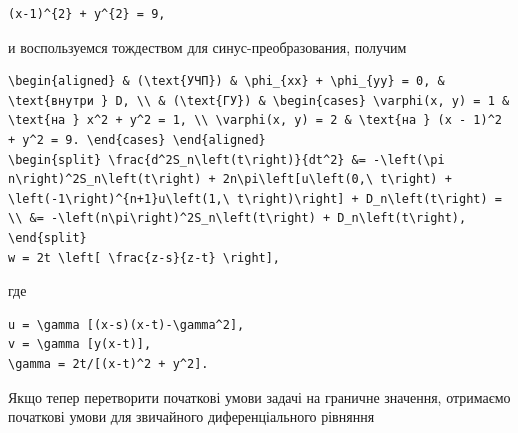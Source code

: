 \documentclass[
  ukrainian,
]{article}
\begin{document}
\begin{verbatim}
(x-1)^{2} + y^{2} = 9,
\end{verbatim}

и воспользуемся тождеством для синус-преобразования, получим

\begin{verbatim}
\begin{aligned} & (\text{УЧП}) & \phi_{xx} + \phi_{yy} = 0, & \text{внутри } D, \\ & (\text{ГУ}) & \begin{cases} \varphi(x, y) = 1 & \text{на } x^2 + y^2 = 1, \\ \varphi(x, y) = 2 & \text{на } (x - 1)^2 + y^2 = 9. \end{cases} \end{aligned}
\begin{split} \frac{d^2S_n\left(t\right)}{dt^2} &= -\left(\pi n\right)^2S_n\left(t\right) + 2n\pi\left[u\left(0,\ t\right) + \left(-1\right)^{n+1}u\left(1,\ t\right)\right] + D_n\left(t\right) = \\ &= -\left(n\pi\right)^2S_n\left(t\right) + D_n\left(t\right), \end{split}
w = 2t \left[ \frac{z-s}{z-t} \right],
\end{verbatim}

где

\begin{verbatim}
u = \gamma [(x-s)(x-t)-\gamma^2],
v = \gamma [y(x-t)],
\gamma = 2t/[(x-t)^2 + y^2].
\end{verbatim}

Якщо тепер перетворити початкові умови задачі на граничне значення,
отримаємо початкові умови для звичайного диференціального рівняння
\end{document}
